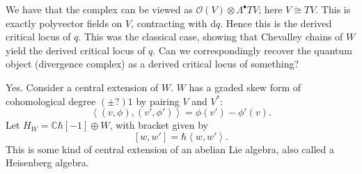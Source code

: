 We have that the complex can be viewed as $\mathcal{O} (V)\otimes \Lambda ^{\bullet} TV$; here $V\cong TV$. This is exactly polyvector fields on $V$, contracting with $\mathrm{d} q$. Hence this is the derived critical locus of $q$. This was the classical case, showing that Chevalley chains of $W$ yield the derived critical locus of $q$. Can we correspondingly recover the quantum object (divergence complex) as a derived critical locus of something?

Yes. Consider a central extension of $W$. $W$ has a graded skew form of cohomological degree $(\pm?)1$ by pairing $V$ and $V^*$:
\[
	\left\langle(v,\phi ),(v',\phi ')\right\rangle=\phi (v')-\phi '(v)
.\]
Let $H_W=\mathbb{C} \hbar [-1]\oplus W$, with bracket given by
\[
	[w,w']=\hbar \left\langle w,w' \right\rangle 
.\]
This is some kind of central extension of an abelian Lie algebra, also called a Heisenberg algebra.

